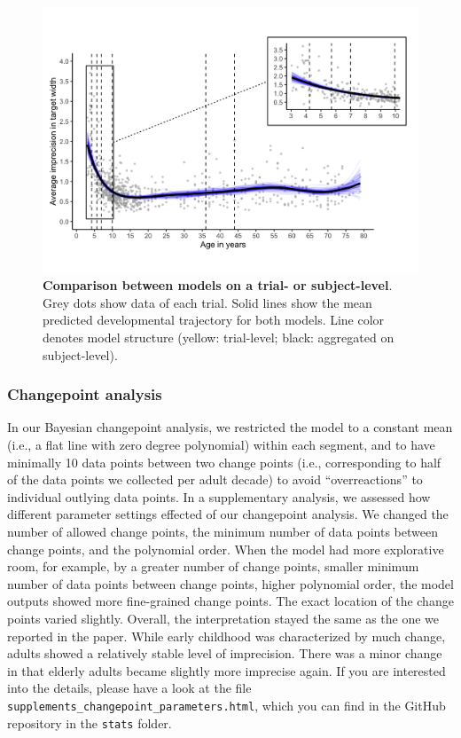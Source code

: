 \documentclass[
  man,floatsintext]{apa7}
\begin{document}
\begin{figure}[H]

{\centering \includegraphics[width=1\linewidth]{../figures/lifespan_plot} 

}

\caption{\textbf{Comparison between models on a trial- or subject-level}. Grey dots show data of each trial. Solid lines show the mean predicted developmental trajectory for both models. Line color denotes model structure (yellow: trial-level; black: aggregated on subject-level).}\label{fig:fig1}
\end{figure}

\hypertarget{changepoint-analysis}{%
\subsubsection{Changepoint analysis}\label{changepoint-analysis}}

In our Bayesian changepoint analysis, we restricted the model to a constant mean (i.e., a flat line with zero degree polynomial) within each segment, and to have minimally 10 data points between two change points (i.e., corresponding to half of the data points we collected per adult decade) to avoid ``overreactions'' to individual outlying data points. In a supplementary analysis, we assessed how different parameter settings effected of our changepoint analysis. We changed the number of allowed change points, the minimum number of data points between change points, and the polynomial order. When the model had more explorative room, for example, by a greater number of change points, smaller minimum number of data points between change points, higher polynomial order, the model outputs showed more fine-grained change points. The exact location of the change points varied slightly. Overall, the interpretation stayed the same as the one we reported in the paper. While early childhood was characterized by much change, adults showed a relatively stable level of imprecision. There was a minor change in that elderly adults became slightly more imprecise again. If you are interested into the details, please have a look at the file \texttt{supplements\_changepoint\_parameters.html}, which you can find in the GitHub repository in the \texttt{stats} folder.
\end{document}
